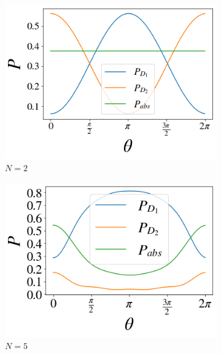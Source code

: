 \documentclass[12pt]{book}
\begin{document}
\begin{figure}[!t]
\centering
\begin{subfigure}[b]{0.30\linewidth}
\includegraphics[width=\linewidth]{images/Azuma_phases2.png}
\caption{$N=2$}
\end{subfigure}
\begin{subfigure}[b]{0.30\linewidth}
\includegraphics[width=\linewidth]{images/Azuma_phases5.png}
\caption{$N=5$ }
\label{fig:BS1}
\end{subfigure}
\begin{subfigure}[b]{0.30\linewidth}

\end{subfigure}
\end{figure}
\end{document}
